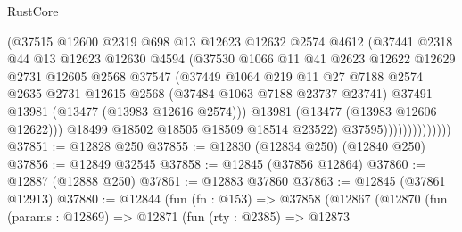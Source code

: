 \begin{lexlean}{RustCore}
\begin{coremodule}
                              (@37515
                                @12600
                                @2319
                                @698
                                @13
                                @12623
                                @12632
                                @2574
                                @4612
                                (@37441
                                  @2318
                                  @44
                                  @13
                                  @12623
                                  @12630
                                  @4594
                                  (@37530
                                    @1066
                                    @11
                                    @41
                                    @2623
                                    @12622
                                    @12629
                                    @2731
                                    @12605
                                    @2568
                                    @37547
                                    (@37449
                                      @1064
                                      @219
                                      @11
                                      @27
                                      @7188
                                      @2574
                                      @2635
                                      @2731
                                      @12615
                                      @2568
                                      (@37484 @1063 @7188 @23737 @23741)
                                      @37491
                                      @13981
                                      (@13477 (@13983 @12616 @2574)))
                                    @13981
                                    (@13477 (@13983 @12606 @12622)))
                                  @18499
                                  @18502
                                  @18505
                                  @18509
                                  @18514
                                  @23522)
                                @37595))))))))))))))
@37851 := @12828 @250
@37855 := @12830 (@12834 @250) (@12840 @250)
@37856 := @12849 @32545
@37858 := @12845 (@37856 @12864)
@37860 := @12887 (@12888 @250)
@37861 := @12883 @37860
@37863 := @12845 (@37861 @12913)
@37880 := @12844
    (fun (fn : @153) =>
    @37858
      (@12867
        (@12870
          (fun (params : @12869) =>
          @12871
            (fun (rty : @2385) =>
            @12873

\end{coremodule}
\end{lexlean}
